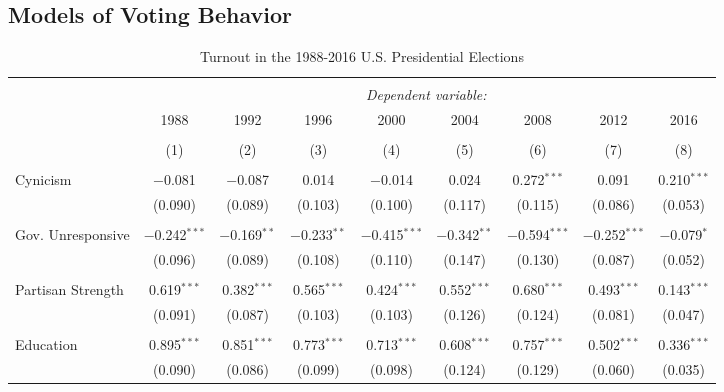 \documentclass[12pt]{article}
\begin{document}
\begin{appendices}
\begin{refsection}
\clearpage
\section{Models of Voting Behavior}\label{app:votemodels}

\begin{table}[!htbp] \centering 
  \caption{Turnout in the 1988-2016 U.S. Presidential Elections}\label{tab:turnout} 
	\begin{adjustbox}{width=\textwidth,center}
	\begin{tabular}{@{\extracolsep{5pt}}lcccccccc} 
	\\[-1.8ex]\hline 
	\hline \\[-1.8ex] 
	 & \multicolumn{8}{c}{\textit{Dependent variable:}} \\ 
	\cline{2-9} 
	 & 1988 & 1992 & 1996 & 2000 & 2004 & 2008 & 2012 & 2016 \\ 
	\\[-1.8ex] & (1) & (2) & (3) & (4) & (5) & (6) & (7) & (8)\\ 
	\hline \\[-1.8ex] 
 Cynicism & $-$0.081 & $-$0.087 & 0.014 & $-$0.014 & 0.024 & 0.272$^{***}$ & 0.091 & 0.210$^{***}$ \\ 
  & (0.090) & (0.089) & (0.103) & (0.100) & (0.117) & (0.115) & (0.086) & (0.053) \\ 
  & & & & & & & & \\ 
 Gov. Unresponsive & $-$0.242$^{***}$ & $-$0.169$^{**}$ & $-$0.233$^{**}$ & $-$0.415$^{***}$ & $-$0.342$^{**}$ & $-$0.594$^{***}$ & $-$0.252$^{***}$ & $-$0.079$^{*}$ \\ 
  & (0.096) & (0.089) & (0.108) & (0.110) & (0.147) & (0.130) & (0.087) & (0.052) \\ 
  & & & & & & & & \\ 
 Partisan Strength & 0.619$^{***}$ & 0.382$^{***}$ & 0.565$^{***}$ & 0.424$^{***}$ & 0.552$^{***}$ & 0.680$^{***}$ & 0.493$^{***}$ & 0.143$^{***}$ \\ 
  & (0.091) & (0.087) & (0.103) & (0.103) & (0.126) & (0.124) & (0.081) & (0.047) \\ 
  & & & & & & & & \\ 
 Education & 0.895$^{***}$ & 0.851$^{***}$ & 0.773$^{***}$ & 0.713$^{***}$ & 0.608$^{***}$ & 0.757$^{***}$ & 0.502$^{***}$ & 0.336$^{***}$ \\ 
  & (0.090) & (0.086) & (0.099) & (0.098) & (0.124) & (0.129) & (0.060) & (0.035) \\ 

\end{tabular}
\end{adjustbox}
\end{table}
\end{refsection}
\end{appendices}
\end{document}

